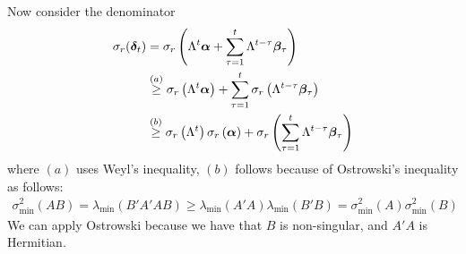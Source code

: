 \documentclass[10pt]{article}
\newcommand{\norm}[1]{\left\|#1\right\|}
\begin{document}

{\color{red}
Now consider the denominator
\begin{align*}
\sigma_r(\bm{\delta}_t) &= \sigma_r\left(\Lambda^t \bm{\alpha} + \sum_{\tau=1}^t \Lambda^{t-\tau} \bm{\beta}_\tau\right) \\
&\overset{(a)}{\geq}  \sigma_r\left(\Lambda^t \bm{\alpha}\right) + \sum_{\tau=1}^t \sigma_r\left(\Lambda^{t-\tau} \bm{\beta}_\tau\right) \\
&\overset{(b)}{\geq}  \sigma_r\left(\Lambda^t \right) \sigma_r \left( \bm{\alpha}\right) + \sigma_r\left( \sum_{\tau=1}^t \Lambda^{t-\tau} \bm{\beta}_\tau\right)
\end{align*}
where $(a)$ uses Weyl's inequality, $(b)$ follows because of Ostrowski's inequality as follows: 
\begin{align*}
\sigma_{\min}^2(AB) = \lambda_{\min}(B'A'A B) \geq \lambda_{\min}(A'A) \lambda_{\min}(B'B) = \sigma_{\min}^2(A) \sigma_{\min}^2(B)
\end{align*}
We can apply Ostrowski because we have that $B$ is non-singular, and $A'A$ is Hermitian. 
}
\end{document}
